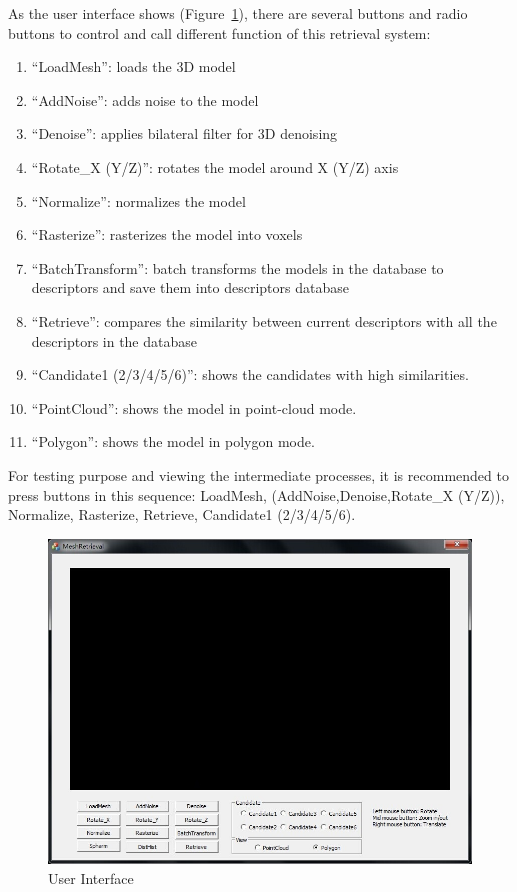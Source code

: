 As the user interface shows (Figure~\ref{usermanual_UI}), there are several buttons and radio buttons to control and call different function of this retrieval system: 

\begin{enumerate}[1.]
\item ``LoadMesh'': loads the 3D model
\item ``AddNoise'': adds noise to the model
\item ``Denoise'': applies bilateral filter for 3D denoising
\item ``Rotate\_X (Y/Z)'': rotates the model around X (Y/Z) axis 
\item ``Normalize'': normalizes the model
\item ``Rasterize'': rasterizes the model into voxels 
\item ``BatchTransform'': batch transforms the models in the database to descriptors and save them into descriptors database
\item ``Retrieve'': compares the similarity between current descriptors with all the descriptors in the database
\item ``Candidate1 (2/3/4/5/6)'': shows the candidates with high similarities.
\item ``PointCloud'': shows the model in point-cloud mode.
\item ``Polygon'': shows the model in polygon mode.
\end{enumerate}

For testing purpose and viewing the intermediate processes, it is recommended to press buttons in this sequence: LoadMesh, (AddNoise,Denoise,Rotate\_X (Y/Z)),  Normalize, Rasterize, Retrieve, Candidate1 (2/3/4/5/6).

\begin{figure}[h]
\centering
\includegraphics[width=0.7\linewidth]{UI}
\caption{User Interface} \label{usermanual_UI}
\end{figure}